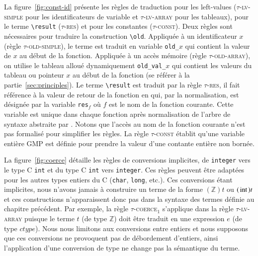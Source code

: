 La figure~\ref{fig:const-id} présente les règles de traduction pour les
left-values (\textsc{$\tau$-lv-simple} pour les identificateurs de variable et
\textsc{$\tau$-lv-array} pour les tableaux), pour le terme
\lstinline'\result' (\textsc{$\tau$-res}) et pour les constantes
(\textsc{$\tau$-const}).
Deux règles sont nécessaires pour traduire la construction \eacsl
\lstinline'\old'.
Appliquée à un identificateur $x$ (règle \textsc{$\tau$-old-simple}), le terme
est traduit en variable \lstinline'old_'$x$ qui contient la valeur de
$x$ au début de la fonction.
Appliquée à un accès mémoire (règle \textsc{$\tau$-old-array}), on utilise le
tableau alloué dynamiquement \lstinline'old_val_'$x$ qui contient les valeurs du
tableau ou pointeur $x$ au début de la fonction (se référer à la
partie~\ref{sec:principles}).
Le terme \lstinline'\result' est traduit par la règle \textsc{$\tau$-res}, il
fait référence à la valeur de retour de la fonction en \eacsl qui, par la
normalisation, est désignée par la variable \lstinline[escapechar=§]'res'$_f$ où
$f$ est le nom de la fonction courante.
Cette variable est unique dans chaque fonction après normalisation de l'arbre de
syntaxe abstraite par \framac.
Notons que l'accès au nom de la fonction courante n'est pas formalisé pour
simplifier les règles.
La règle \textsc{$\tau$-const} établit qu'une variable entière GMP est définie
pour prendre la valeur d'une contante entière non bornée.



La figure~\ref{fig:coerce} détaille les règles de conversions implicites, de
\lstinline'integer' vers le type C \lstinline'int' et du type C \lstinline'int'
vers \lstinline'integer'.
Ces règles peuvent être adaptées pour les autres types entiers du C
(\lstinline'char', \lstinline'long', etc.).
Ces conversions étant implicites, nous n'avons jamais à construire un terme
de la forme $(\mathbb{Z})t$ ou $(\mbox{\lstinline'int'})t$ et ces constructions
n'apparaissent donc pas dans la syntaxe des termes définie au chapitre
précédent.
Par exemple, la règle \textsc{$\tau$-coerce$_1$} s'applique dans la règle
\textsc{$\tau$-lv-array} puisque le terme $t$ (de type $\mathbb{Z}$) doit être
traduit en une expression $e$ (de type $ctype$).
Nous nous limitons aux conversions entre entiers et nous supposons que ces
conversions ne provoquent pas de débordement d'entiers, ainsi l'application
d'une conversion de type ne change pas la sémantique du terme.



